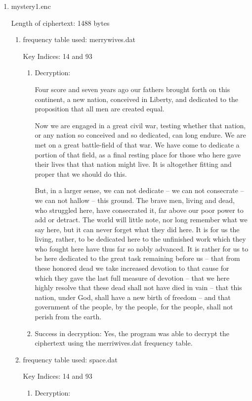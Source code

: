 \documentclass{ashoka-crypto}
\begin{document}
\begin{enumerate}
\item mystery1.enc

Length of ciphertext: 1488 bytes

\begin{enumerate}
\item frequency table used: merrywives.dat

Key Indices: 14 and 93
\begin{enumerate}
\item Decryption:

Four score and seven years ago our fathers brought forth on this continent, a new nation, conceived in Liberty, and dedicated to the proposition that all men are created equal. 

Now we are engaged in a great civil war, testing whether that nation, or any nation so conceived and so dedicated, can long endure. We are met on a great battle-field of that war. We have come to dedicate a portion of that field, as a final resting place for those who here gave their lives that that nation might live. It is altogether fitting and proper that we should do this. 

But, in a larger sense, we can not dedicate -- we can not consecrate -- we can not hallow -- this ground. The brave men, living and dead, who struggled here, have consecrated it, far above our poor power to add or detract. The world will little note, nor long remember what we say here, but it can never forget what they did here. It is for us the living, rather, to be dedicated here to the unfinished work which they who fought here have thus far so nobly advanced. It is rather for us to be here dedicated to the great task remaining before us -- that from these honored dead we take increased devotion to that cause for which they gave the last full measure of devotion -- that we here highly resolve that these dead shall not have died in vain -- that this nation, under God, shall have a new birth of freedom -- and that government of the people, by the people, for the people, shall not perish from the earth.

\item Success in decryption: Yes, the program was able to decrypt the ciphertext using the merriwives.dat frequency table.
\end{enumerate}
\item frequency table used: space.dat

Key Indices: 14 and 93
\begin{enumerate}
\item Decryption:


\end{enumerate}
\end{enumerate}
\end{enumerate}
\end{document}
